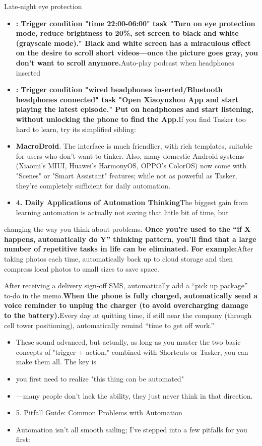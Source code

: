 Late-night eye protection

\begin{itemize}
  \item \textbf{: Trigger condition "time 22:00-06:00" task "Turn on eye protection mode, reduce brightness to 20\%, set screen to black and white (grayscale mode)." Black and white screen has a miraculous effect on the desire to scroll short videos—once the picture goes gray, you don't want to scroll anymore.}Auto-play podcast when headphones inserted
  \item \textbf{: Trigger condition "wired headphones inserted/Bluetooth headphones connected" task "Open Xiaoyuzhou App and start playing the latest episode." Put on headphones and start listening, without unlocking the phone to find the App.}If you find Tasker too hard to learn, try its simplified sibling:
  \item \textbf{MacroDroid}. The interface is much friendlier, with rich templates, suitable for users who don't want to tinker. Also, many domestic Android systems (Xiaomi's MIUI, Huawei's HarmonyOS, OPPO's ColorOS) now come with "Scenes" or "Smart Assistant" features; while not as powerful as Tasker, they're completely sufficient for daily automation.
  \item \textbf{4. Daily Applications of Automation Thinking}The biggest gain from learning automation is actually not saving that little bit of time, but
\end{itemize}

changing the way you think about problems\textbf{. Once you're used to the “if X happens, automatically do Y” thinking pattern, you'll find that a large number of repetitive tasks in life can be eliminated. For example:}After taking photos each time, automatically back up to cloud storage and then compress local photos to small sizes to save space.


After receiving a delivery sign-off SMS, automatically add a “pick up package” to-do in the memo.\textbf{When the phone is fully charged, automatically send a voice reminder to unplug the charger (to avoid overcharging damage to the battery).}Every day at quitting time, if still near the company (through cell tower positioning), automatically remind “time to get off work.”

\begin{itemize}
  \item These sound advanced, but actually, as long as you master the two basic concepts of "trigger + action," combined with Shortcuts or Tasker, you can make them all. The key is
  \item you first need to realize "this thing can be automated"
  \item —many people don't lack the ability, they just never think in that direction.
  \item 5. Pitfall Guide: Common Problems with Automation
  \item Automation isn't all smooth sailing; I've stepped into a few pitfalls for you first:
\end{itemize}

